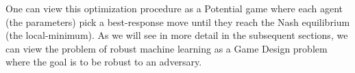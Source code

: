 One can view this optimization procedure as a Potential game where each agent (the parameters) pick a best-response move until they reach the Nash equilibrium (the local-minimum). As we will see in more detail in the subsequent sections, we can view the problem of robust machine learning as a Game Design problem where the goal is to be robust to an adversary.
